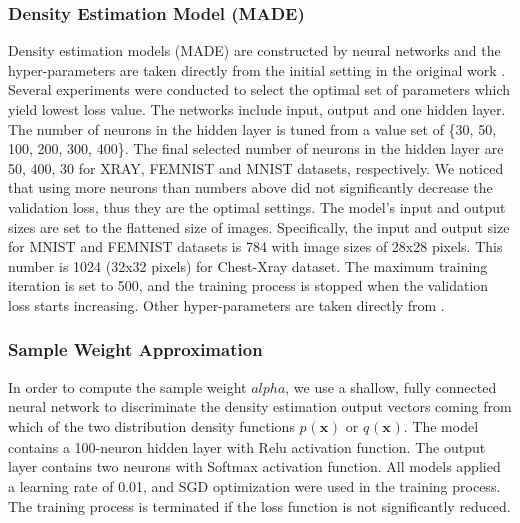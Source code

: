 \documentclass[journal]{IEEEtai}
\newcommand{\px}[2]{p_{#1}(\mathbf{x_{#2}})}
\newcommand{\qx}[2]{q_{#1}(\mathbf{x_{#2}})}
\begin{document}
\subsubsection{Density Estimation Model (MADE)} Density estimation models (MADE) are constructed by neural networks and the hyper-parameters are taken directly from the initial setting in the original work \cite{MADE}. Several experiments were conducted to select the optimal set of parameters which yield lowest loss value. The networks include input, output and one hidden layer. The number of neurons in the hidden layer is tuned from a value set of \{30, 50, 100, 200, 300, 400\}. The final selected number of neurons in the hidden layer are 50, 400, 30 for XRAY, FEMNIST and MNIST datasets, respectively. We noticed that using more neurons than numbers above did not significantly decrease the validation loss, thus they are the optimal settings. The model's input and output sizes are set to the flattened size of images. Specifically, the input and output size for MNIST and FEMNIST datasets is 784 with image sizes of 28x28 pixels. This number is 1024 (32x32 pixels) for Chest-Xray dataset. The maximum training iteration is set to 500, and the training process is stopped when the validation loss starts increasing. Other hyper-parameters are taken directly from \cite{MADE}.

\subsubsection{Sample Weight Approximation} In order to compute the sample weight $alpha$, we use a shallow, fully connected neural network to discriminate the density estimation output vectors coming from which of the two distribution density functions $\px{}{}$ or $\qx{}{}$. The model contains a 100-neuron hidden layer with Relu activation function. The output layer contains two neurons with Softmax activation function. All models applied a learning rate of 0.01, and SGD optimization were used in the training process. The training process is terminated if the loss function is not significantly reduced.
\end{document}
